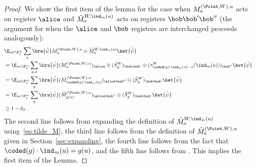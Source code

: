 \begin{proof}
We show the first item of the lemma for the case when $M^{(\Point,W),u}_a$ acts on register $\alice$ and $\tilde{M}^{W,\ind_m(u)}_a$ acts on registers $\bob \bob' \bob''$ (the argument for when the $\alice$ and $\bob$ registers are interchanged proceeds analogously):
	\begin{align*}
		&\E_{u \in \F_q^m} \sum_a \bra{\hat{\psi}} M^{(\Point,W),u}_a \otimes \tilde{M}^{W,\ind_m(u)}_a \ket{\hat{\psi}} \\
		&= \E_{u \in \F_q^m} \sum_{g,a} \bra{\hat{\psi}} (M^{(\Point,W),u}_a)_{\alice} \otimes (\hat{S}^W_g)_{\bob \bob'} \otimes (\tau^W_{\coded(g) \cdot \ind_m(u) -a}(\ind_m(u)))_{\bob''} \ket{\hat{\psi}} \\
		&= \E_{u \in \F_q^m} \sum_{g} \bra{\hat{\psi}} (\hat{M}^{(\Point,W),u}_{\coded(g) \cdot \ind_m(u)})_{\alice \bob''} \otimes (\hat{S}^W_g)_{\bob \bob'} \ket{\hat{\psi}} \\
		&= \E_{u \in \F_q^m} \sum_{g} \bra{\hat{\psi}} (\hat{M}^{(\Point,W),u}_{g(u)})_{\alice \bob''} \otimes (\hat{S}^W_g)_{\bob \bob'} \ket{\hat{\psi}} \\
		&\geq 1 - \delta_S\;.
	\end{align*}
	The second line follows from expanding the definition of $\tilde{M}^{W,\ind_m(u)}_a$ using~\eqref{eq:tilde_M}, the third line follows from the definition of $\hat{M}^{(\Point,W),u}_a$ given in Section~\ref{sec:expanding}, the fourth line follows from the fact that $\coded(g) \cdot \ind_m(u) = g(u)$, and the fifth line follows from . This implies the first item of the Lemma.



\end{proof}
